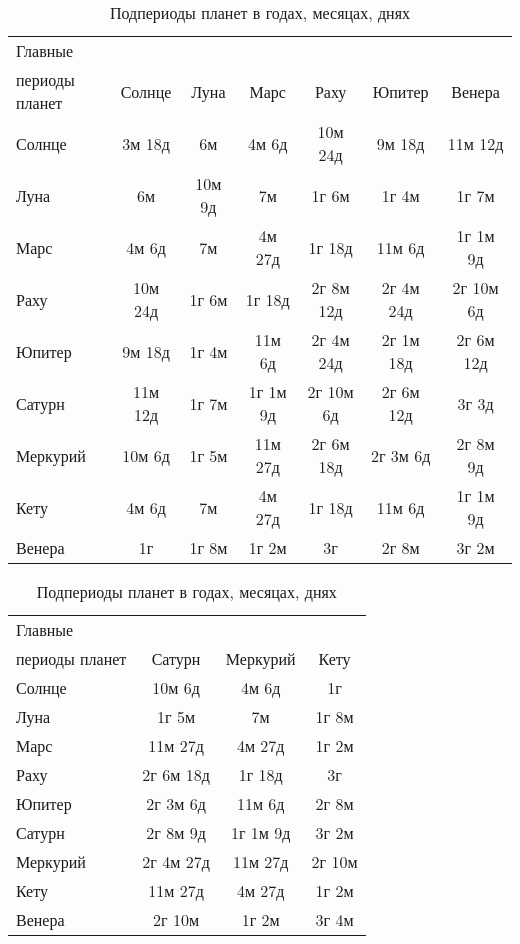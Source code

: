 \begin{table}[tph!]
	\caption{Подпериоды планет в годах, месяцах, днях}
	\label{tbl:stargroups}

	\centering

	\renewcommand{\arraystretch}{1}

	\begin{tabular}{|p{}|c|c|c|c|c|c|}
		\hline
		Главные & & & & & & \\
		периоды планет & Солнце & Луна & Марс & Раху & Юпитер & Венера \\
		\hline
		Солнце   & 3м 18д  & 6м     & 4м 6д    & 10м 24д   & 9м 18д    & 11м 12д   \\
		Луна     & 6м      & 10м 9д & 7м       & 1г 6м     & 1г 4м     & 1г 7м     \\
		Марс     & 4м 6д   & 7м     & 4м 27д   & 1г 18д    & 11м 6д    & 1г 1м 9д  \\
		Раху     & 10м 24д & 1г 6м  & 1г 18д   & 2г 8м 12д & 2г 4м 24д & 2г 10м 6д \\
		Юпитер   & 9м 18д  & 1г 4м  & 11м 6д   & 2г 4м 24д & 2г 1м 18д & 2г 6м 12д \\
		Сатурн   & 11м 12д & 1г 7м  & 1г 1м 9д & 2г 10м 6д & 2г 6м 12д & 3г 3д     \\
		Меркурий & 10м 6д  & 1г 5м  & 11м 27д  & 2г 6м 18д & 2г 3м 6д  & 2г 8м 9д  \\
		Кету     & 4м 6д   & 7м     & 4м 27д   & 1г 18д    & 11м 6д    & 1г 1м 9д  \\
		Венера   & 1г      & 1г 8м  & 1г 2м    & 3г        & 2г 8м     & 3г 2м     \\
		\hline
	\end{tabular}
	\newline
	\begin{tabular}{|p{}|c|c|c|}
		\hline
		Главные & & & \\
		периоды планет & Сатурн & Меркурий & Кету \\
		\hline
		Солнце   & 10м 6д    & 4м 6д    & 1г \\
		Луна     & 1г 5м     & 7м       & 1г 8м \\
		Марс     & 11м 27д   & 4м 27д   & 1г 2м \\
		Раху     & 2г 6м 18д & 1г 18д   & 3г \\
		Юпитер   & 2г 3м 6д  & 11м 6д   & 2г 8м \\
		Сатурн   & 2г 8м 9д  & 1г 1м 9д & 3г 2м \\
		Меркурий & 2г 4м 27д & 11м 27д  & 2г 10м \\
		Кету     & 11м 27д   & 4м 27д   & 1г 2м \\
		Венера   & 2г 10м    & 1г 2м    & 3г 4м \\
		\hline
	\end{tabular}
\end{table}


